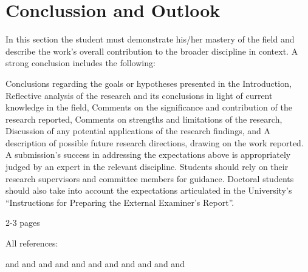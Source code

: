 \chapter{Conclussion and Outlook}
\label{conclussion}

In this section the student must demonstrate his/her mastery of the field and describe the work's overall contribution to the broader discipline in context. A strong conclusion includes the following:

Conclusions regarding the goals or hypotheses presented in the Introduction,
Reflective analysis of the research and its conclusions in light of current knowledge in the field,
Comments on the significance and contribution of the research reported,
Comments on strengths and limitations of the research,
Discussion of any potential applications of the research findings, and
A description of possible future research directions, drawing on the work reported.
A submission's success in addressing the expectations above is appropriately judged by an expert in the relevant discipline. Students should rely on their research supervisors and committee members for guidance. Doctoral students should also take into account the expectations articulated in the University's “Instructions for Preparing the External Examiner's Report”.

2-3 pages

All references:

\citep{article:01:visual} and \citep{article:02:laser} and \citep{article:03:motorsignals} and \citep{article:04:onlinelearning} and \citep{thesis:05:proprioception} and \citep{article:06:haptic} and \citep{thesis:07:proprioception} and \citep{article:08:rhex} and \citep{article:09:roughterrain} and \citep{article:10:pruningalgs} and \citep{book:11:scorpion} and \citep{thesis:12:gaitcontrol}